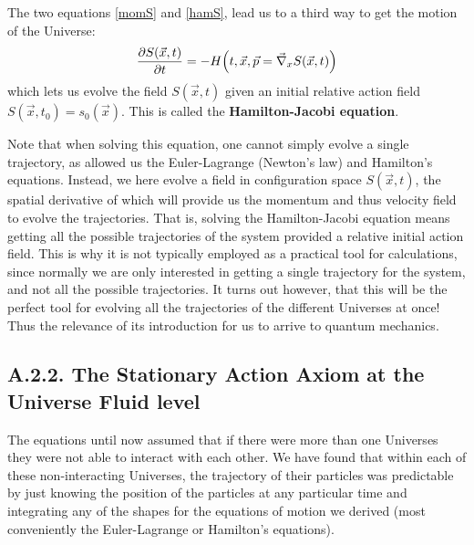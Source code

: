 \documentclass[11pt, a4paper]{article} %
\begin{document}
The two equations \eqref{momS} and \eqref{hamS}, lead us to a third way to get the motion of the Universe:
\begin{equation}\label{HJE}
\pdv{S(\vec{x},t)}{t}=-H\qty(t, \vec{x}, \vec{p}=\vec{\nabla}_{x}S(\vec{x},t))
\end{equation}
which lets us evolve the field $S(\vec{x},t)$ given an initial relative action field $S(\vec{x},t_0)=s_0(\vec{x})$. This is called the {\bf Hamilton-Jacobi equation}. 

Note that when solving this equation, one cannot simply evolve a single trajectory, as allowed us the Euler-Lagrange (Newton's law) and Hamilton's equations. Instead, we here evolve a field in configuration space $S(\vec{x},t)$, the spatial derivative of which will provide us the momentum and thus velocity field to evolve the trajectories. That is, solving the Hamilton-Jacobi equation means getting all the possible trajectories of the system provided a relative initial action field. This is why it is not typically employed as a practical tool for calculations, since normally we are only interested in getting a single trajectory for the system, and not all the possible trajectories. It turns out however, that this will be the perfect tool for evolving all the trajectories of the different Universes at once! Thus the relevance of its introduction for us to arrive to quantum mechanics.

\subsection*{A.2.2. The Stationary Action Axiom at the Universe Fluid level}


The equations until now assumed that if there were more than one Universes they were not able to interact with each other. We have found that within each of these non-interacting Universes, the trajectory of their particles was predictable by just knowing the position of the particles at any particular time and integrating any of the shapes for the equations of motion we derived (most conveniently the Euler-Lagrange or Hamilton's equations). 
\end{document}
